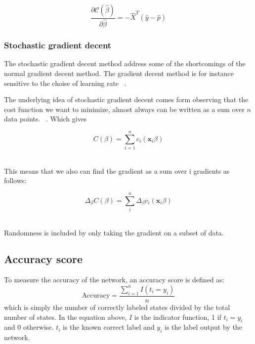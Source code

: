 \begin{equation}\label{eq:delta-c}
	\frac{\partial \mathcal{C}(\hat{\beta})}{\partial \hat{\beta}} = -\hat{X}^T\left(\hat{y}-\hat{p}\right)
\end{equation}

\subsubsection{Stochastic gradient decent} 
The stochastic gradient decent method address some of the shortcomings 
of the normal gradient decent method. The gradient decent method is 
for instance sensitive to the choise of learning rate ~\cite{LectureNotes-FysStk}.

The underlying idea of stochastic gradient decent comes form observing
that the cost function we want to minimize, almost always can be written as 
a sum over \(n\) data points. ~\cite{LectureNotes-FysStk}. Which gives

\begin{equation}
	C(\beta) = \sum\limits_{i=1}^n c_i (\mathbf{x}_i\beta)
\end{equation} ~\cite{LectureNotes-FysStk}

This means that we also can find the gradient as a sum over i gradients
as follows: 

\begin{equation}
	\Delta_{\beta} C(\beta) = \sum\limits_{i}^n \Delta_{\beta}c_i (\mathbf{x}_i\beta)
\end{equation} ~\cite{LectureNotes-FysStk}

Randomness is included by only taking the gradient on a subset of data. 

\subsection{Accuracy score}\label{seq:accuracy} 
To measure the accuracy of the network, an accuracy score is defined as:
\begin{equation*}
	\text{Accuracy} = \frac{\sum_{i=1}^{n} I(t_i = y_i)}{n}
\end{equation*}
which is simply the number of correctly labeled states divided by the
total number of states. In the equation above, $I$ is the indicator function,
1 if $t_i = y_i$ and 0 otherwise. $t_i$ is the known correct label and $y_i$ is the
label output by the network.





